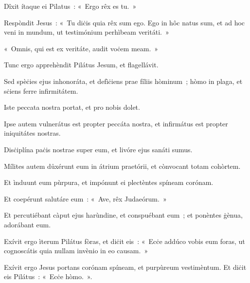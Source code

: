 Dîxit ítaque ei Pilatus~: «~Ergo rêx es tu.~» 

Respòndit Jesus~: «~Tu diċis quia rêx sum ego. Ego in hôc natus sum, et ad hoc veni in mundum, ut testimónium perhìbeam veritáti.~» 

«~Omnis, qui est ex veritáte, audit voċem meam.~» 

Tunc ergo apprehèndit Pilátus Jesum, et flagellávit. 

Sed spèċies ejus inhonoráta, et defìċiens prae fíliis hòminum~; hòmo in plaga, et sċiens ferre infirmitátem. 

Iste peccata nostra portat, et pro nobis dolet. 

Ipse autem vulnerátus est propter peccáta nostra, et infirmátus est propter iniquitátes nostras. 

Disċiplína paċis nostrae super eum, et livóre ejus sanáti sumus. 

\mysteryEnd
{}

Mílites autem důxérunt eum in átrium praetórii, et cònvocant totam cohòrtem. 

Et ìnduunt eum pùrpura, et impónunt ei plectèntes spíneam corónam. 

Et coepérunt salutáre eum~: «~Ave, rêx Judaeórum.~» 

Et percutiébant càput ejus harùndine, et conspuébant eum~; et ponèntes ġènua, adorábant eum. 

Exívit ergo ìterum Pilátus fòras, et diċit eis~: «~Ecċe addúco vobis eum foras, ut cognoscátis quia nullam invènio in eo causam.~» 

Exívit ergo Jesus portans corónam spíneam, et purpùreum vestimèntum. Et diċit eis Pilátus~: «~Ecċe hòmo.~». 

